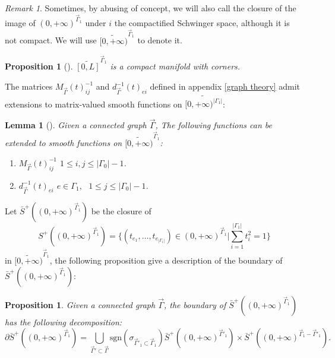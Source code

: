 \documentclass[11pt]{amsart}
\newtheorem{lem}[thm]{Lemma}
\newtheorem{prop}[thm]{Proposition}
\theoremstyle{definition}
\theoremstyle{remark}
\newtheorem{rem}[thm]{Remark}
\numberwithin{equation}{section}
\begin{document}
\begin{rem}
  Sometimes, by abusing of concept, we will also call the closure of the image
  of $(0, + \infty)^{\vec{\Gamma}_1 }$ under $i$ the compactified Schwinger
  space, although it is not compact. We will use $\widetilde{[0, + \infty)}^{\vec{\Gamma}_1}$ to denote it.
\end{rem}

\begin{prop}[\cite{Ammann2019ACO}]
  $\widetilde{[0, L]}^{\vec{\Gamma}_1}$ is a compact manifold with corners.
\end{prop}

The matrices $M_{\vec{\Gamma}} (t)^{- 1}_{i j}$ and $d^{-1}_{\vec{\Gamma}}(t)_{ei}$
defined in appendix \ref{graph theory} admit extensions to matrix-valued smooth functions on
$\widetilde{[0, + \infty)^{| \Gamma_1 |}}$:

\begin{lem}[\cite{wang2024feynman}]
  \label{extended functions}Given a connected graph $\vec{\Gamma}$, The following functions can be extended to smooth functions on
  $\widetilde{[0, + \infty)}^{ \vec{\Gamma}_1 }$:
  \begin{enumerate}
    \item $M_{\vec{\Gamma}} (t)^{- 1}_{i j}$  $1 \leqslant i, j \leqslant |
    \Gamma_0 | - 1$.

    \item $d^{-1}_{\vec{\Gamma}}(t)_{ei}$  $e \in \Gamma_1, \text{ } 1
    \leqslant j \leqslant | \Gamma_0 | - 1$.
  \end{enumerate}
\end{lem}

Let $\bar{S}^{+}((0,+\infty)^{\vec{\Gamma}_{1}})$ be the closure of
$$
    S^{+}((0,+\infty)^{\vec{\Gamma}_{1}})=\{(t_{e_{1}},\dots,t_{e_{|\Gamma_{1}|}})\in(0,+\infty)^{\vec{\Gamma}_{1}}|\sum_{i=1}^{|\Gamma_{1}|}t_{i}^{2}=1\}
$$in $\widetilde{[0,+\infty)}^{\vec{\Gamma}_{1}}$, the following proposition give a description of the boundary of $\bar{S}^{+}((0,+\infty)^{\vec{\Gamma}_{1}})$:

\begin{prop}
  \label{boundary description}Given a connected graph $\vec{\Gamma}$, the boundary of
  $\bar{S}^{+}((0,+\infty)^{\vec{\Gamma}_{1}})$ has the following decomposition:
  \[ \partial \bar{S}^{+}((0,+\infty)^{\vec{\Gamma}_{1}}) = \bigcup_{\vec{\Gamma}'
       \subset \vec{\Gamma}} \mathrm{sgn}(\sigma_{\vec{\Gamma}'_{1}\subset \vec{\Gamma}_{1}})
       \bar{S}^{+}((0,+\infty)^{\vec{\Gamma}'_{1}}) \times
       \bar{S}^{+}((0,+\infty)^{\vec{\Gamma}_{1}- \vec{\Gamma}'_{1}}). \]
\end{prop}
\end{document}

